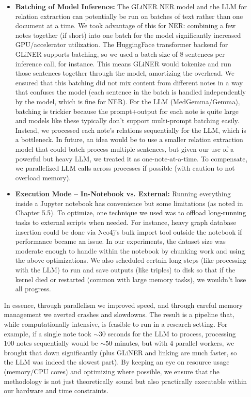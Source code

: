 \begin{itemize}
\item \textbf{Batching of Model Inference:} The GLiNER NER model and the LLM for relation extraction can potentially be run on batches of text rather than one document at a time. We took advantage of this for NER: combining a few notes together (if short) into one batch for the model significantly increased GPU/accelerator utilization. The HuggingFace transformer backend for GLiNER supports batching, so we used a batch size of 8 sentences per inference call, for instance. This means GLiNER would tokenize and run those sentences together through the model, amortizing the overhead. We ensured that this batching did not mix content from different notes in a way that confuses the model (each sentence in the batch is handled independently by the model, which is fine for NER). For the LLM (MedGemma/Gemma), batching is trickier because the prompt+output for each note is quite large and models like these typically don't support multi-prompt batching easily. Instead, we processed each note's relations sequentially for the LLM, which is a bottleneck. In future, an idea would be to use a smaller relation extraction model that could batch process multiple sentences, but given our use of a powerful but heavy LLM, we treated it as one-note-at-a-time. To compensate, we parallelized LLM calls across processes if possible (with caution to not overload memory).

\item \textbf{Execution Mode – In-Notebook vs. External:} Running everything inside a Jupyter notebook has convenience but some limitations (as noted in Chapter 5.5). To optimize, one technique we used was to offload long-running tasks to external scripts when needed. For instance, heavy graph database insertion could be done via Neo4j's bulk import tool outside the notebook if performance became an issue. In our experiments, the dataset size was moderate enough to handle within the notebook by chunking work and using the above optimizations. We also scheduled certain long steps (like processing with the LLM) to run and save outputs (like triples) to disk so that if the kernel died or restarted (common with large memory tasks), we wouldn't lose all progress.
\end{itemize}

In essence, through parallelism we improved speed, and through careful memory management we averted crashes and slowdowns. The result is a pipeline that, while computationally intensive, is feasible to run in a research setting. For example, if a single note took $\sim$30 seconds for the LLM to process, processing 100 notes sequentially would be $\sim$50 minutes, but with 4 parallel workers, we brought that down significantly (plus GLiNER and linking are much faster, so the LLM was indeed the slowest part). By keeping an eye on resource usage (memory/CPU cores) and optimizing where possible, we ensure that the methodology is not just theoretically sound but also practically executable within our hardware and time constraints.

